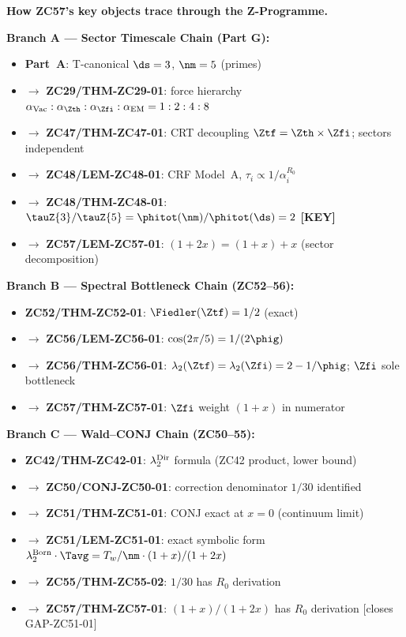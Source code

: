 \documentclass[12pt, a4paper]{article}
\begin{document}
\begin{genealogybox}
\textbf{How ZC57's key objects trace through the Z-Programme.}

\medskip
\textbf{Branch A --- Sector Timescale Chain (Part G):}
\begin{itemize}[leftmargin=2em, noitemsep]
\item \textbf{Part~A}: T-canonical $\ds=3$, $\nm=5$ (primes)
\item $\to$ \textbf{ZC29/THM-ZC29-01}: force hierarchy
  $\alpha_{\rm Vac}:\alpha_{\Zth}:\alpha_{\Zfi}:\alpha_{\rm EM}=1:2:4:8$
\item $\to$ \textbf{ZC47/THM-ZC47-01}: CRT decoupling
  $\Ztf=\Zth\times\Zfi$; sectors independent
\item $\to$ \textbf{ZC48/LEM-ZC48-01}: CRF Model~A,
  $\tau_i\propto1/\alpha_i^{R_0}$
\item $\to$ \textbf{ZC48/THM-ZC48-01}: $\tauZ{3}/\tauZ{5}
  =\phitot(\nm)/\phitot(\ds)=2$ \textbf{[KEY]}
\item $\to$ \textbf{ZC57/LEM-ZC57-01}: $(1+2x)=(1+x)+x$
  (sector decomposition)
\end{itemize}

\medskip
\textbf{Branch B --- Spectral Bottleneck Chain (ZC52--56):}
\begin{itemize}[leftmargin=2em, noitemsep]
\item \textbf{ZC52/THM-ZC52-01}: $\Fiedler(\Ztf)=1/2$ (exact)
\item $\to$ \textbf{ZC56/LEM-ZC56-01}: $\cos(2\pi/5)=1/(2\phig)$
\item $\to$ \textbf{ZC56/THM-ZC56-01}: $\lambda_2(\Ztf)
  =\lambda_2(\Zfi)=2-1/\phig$; $\Zfi$ sole bottleneck
\item $\to$ \textbf{ZC57/THM-ZC57-01}: $\Zfi$ weight $(1+x)$
  in numerator
\end{itemize}

\medskip
\textbf{Branch C --- Wald--CONJ Chain (ZC50--55):}
\begin{itemize}[leftmargin=2em, noitemsep]
\item \textbf{ZC42/THM-ZC42-01}: $\lambda_2^{\rm Dir}$ formula
  (ZC42 product, lower bound)
\item $\to$ \textbf{ZC50/CONJ-ZC50-01}: correction denominator
  $1/30$ identified
\item $\to$ \textbf{ZC51/THM-ZC51-01}: CONJ exact at $x=0$
  (continuum limit)
\item $\to$ \textbf{ZC51/LEM-ZC51-01}: exact symbolic form
  $\lambda_2^{\rm Born}\cdot\Tavg = T_w/\nm\cdot(1+x)/(1+2x)$
\item $\to$ \textbf{ZC55/THM-ZC55-02}: $1/30$ has $R_0$ derivation
\item $\to$ \textbf{ZC57/THM-ZC57-01}: $(1+x)/(1+2x)$ has
  $R_0$ derivation [closes GAP-ZC51-01]
\end{itemize}


\end{genealogybox}
\end{document}
